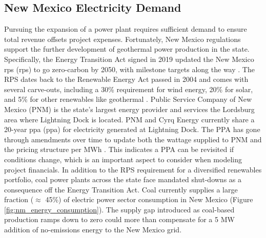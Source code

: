 \subsection{New Mexico Electricity Demand}\label{ch4:nm_rps}
Pursuing the expansion of a power plant requires sufficient demand to ensure total revenue offsets project expenses. Fortunately, New Mexico regulations support the further development of geothermal power production in the state. Specifically, the Energy Transition Act signed in 2019 updated the New Mexico \acrlong{rps} (\acrshort{rps}) to go zero-carbon by 2050, with milestone targets along the way \citep{lillian_new_2019}. The RPS dates back to the Renewable Energy Act passed in 2004 and comes with several carve-outs, including a 30\% requirement for wind energy, 20\% for solar, and 5\% for other renewables like geothermal \citep{dsire_dsire_2021}. Public Service Company of New Mexico (PNM) is the state’s largest energy provider and services the Lordsburg area where Lightning Dock is located. PNM and Cyrq Energy currently share a 20-year \acrlong{ppa} (\acrshort{ppa}) for electricity generated at Lightning Dock. The PPA has gone through amendments over time to update both the wattage supplied to PNM and the pricing structure per MWh \citep[e.g.,][]{pnm_public_2014,stanfield_new_2017}. This indicates a PPA can be revisited if conditions change, which is an important aspect to consider when modeling project financials. 
In addition to the RPS requirement for a diversified renewables portfolio, coal power plants across the state face mandated shut-downs as a consequence off the Energy Transition Act. Coal currently supplies a large fraction ($\approx$ 45\%) of electric power sector consumption in New Mexico (Figure \ref{fig:nm_energy_consumption}). The supply gap introduced as coal-based production ramps down to zero could more than compensate for a 5 MW addition of no-emissions energy to the New Mexico grid.

